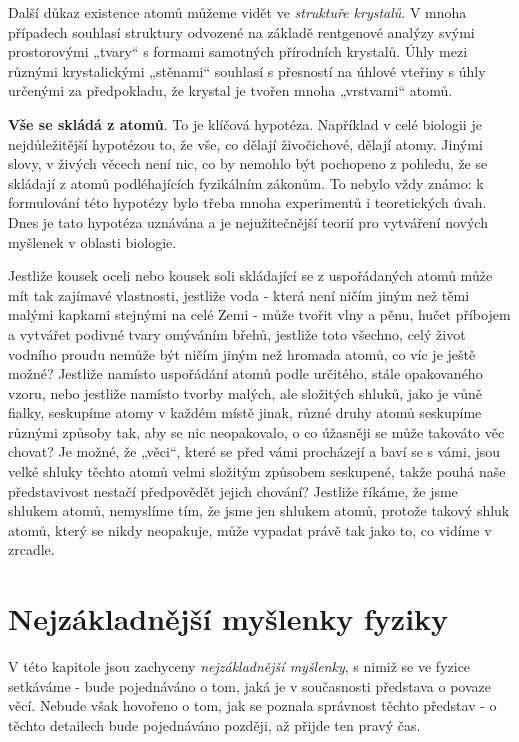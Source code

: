       Další důkaz existence atomů můžeme vidět ve \emph{struktuře krystalů}. V mnoha případech 
      souhlasí struktury odvozené na základě rentgenové analýzy svými prostorovými „tvary“ s 
      formami samotných přírodních krystalů. Úhly mezi různými krystalickými „stěnami“ souhlasí s 
      přesností na úhlové vteřiny s úhly určenými za předpokladu, že krystal je tvořen mnoha 
      „vrstvami“ atomů.
      
      \textbf{Vše se skládá z atomů}. To je klíčová hypotéza. Například v celé biologii je 
      nejdůležitější hypotézou to, že vše, co dělají živočichové, dělají atomy. Jinými slovy, v 
      živých věcech není nic, co by nemohlo být pochopeno z pohledu, že se skládají z atomů 
      podléhajících fyzikálním zákonům. To nebylo vždy známo: k formulování této hypotézy bylo 
      třeba mnoha experimentů i teoretických úvah. Dnes je tato hypotéza uznávána a je 
      nejužitečnější teorií pro vytváření nových myšlenek v oblasti biologie.
      
      Jestliže kousek oceli nebo kousek soli skládající se z uspořádaných atomů může mít tak 
      zajímavé vlastnosti, jestliže voda - která není ničím jiným než těmi malými kapkami stejnými 
      na celé Zemi - může tvořit vlny a pěnu, hučet příbojem a vytvářet podivné tvary omýváním 
      břehů, jestliže toto všechno, celý život vodního proudu nemůže být ničím jiným než hromada 
      atomů, co víc je ještě možné? Jestliže namísto uspořádání atomů podle určitého, stále 
      opakovaného vzoru, nebo jestliže namísto tvorby malých, ale složitých shluků, jako je vůně 
      fialky, seskupíme atomy v každém místě jinak, různé druhy atomů seskupíme různými způsoby 
      tak, aby se nic neopakovalo, o co úžasněji se může takováto věc chovat? Je možné, že „věci“, 
      které se před vámi procházejí a baví se s vámi, jsou velké shluky těchto atomů velmi složitým 
      způsobem seskupené, takže pouhá naše představivost nestačí předpovědět jejich chování? 
      Jestliže říkáme, že jsme shlukem atomů, nemyslíme tím, že jsme jen shlukem atomů, protože 
      takový shluk atomů, který se nikdy neopakuje, může vypadat právě tak jako to, co vidíme v 
      zrcadle.
            
  \section{Nejzákladnější myšlenky fyziky}\label{fyz:IchapIsecII}
    V této kapitole jsou zachyceny \emph{nejzákladnější myšlenky}, s nimiž se ve fyzice setkáváme - 
    bude pojednáváno o tom, jaká je v současnosti představa o povaze věcí. Nebude však hovořeno o 
    tom, jak se poznala správnost těchto představ - o těchto detailech bude pojednáváno později, až 
    přijde ten pravý čas.

